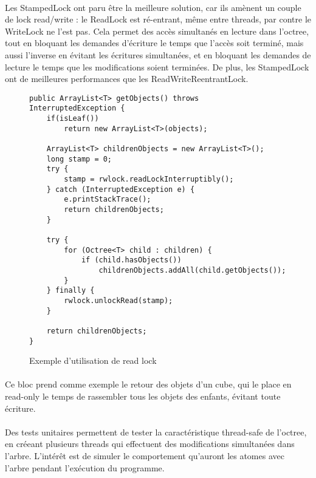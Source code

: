 \paragraph{}
Les StampedLock ont paru être la meilleure solution, car ils amènent un couple
de lock read/write : le ReadLock est ré-entrant, même entre threads, par contre
le WriteLock ne l'est pas. Cela permet des accès simultanés en lecture dans
l'octree, tout en bloquant les demandes d'écriture le temps que l'accès soit
terminé, mais aussi l'inverse en évitant les écritures simultanées, et en
bloquant les demandes de lecture le temps que les modifications soient
terminées. De plus, les StampedLock ont de meilleures performances que les
ReadWriteReentrantLock.


\begin{figure}[H]
\begin{lstlisting}
public ArrayList<T> getObjects() throws InterruptedException {
    if(isLeaf())
        return new ArrayList<T>(objects);

    ArrayList<T> childrenObjects = new ArrayList<T>();
    long stamp = 0;
    try {
        stamp = rwlock.readLockInterruptibly();
    } catch (InterruptedException e) {
        e.printStackTrace();
        return childrenObjects;
    }

    try {
        for (Octree<T> child : children) {
            if (child.hasObjects())
                childrenObjects.addAll(child.getObjects());
        }
    } finally {
        rwlock.unlockRead(stamp);
    }

    return childrenObjects;
}
\end{lstlisting}
\caption{Exemple d'utilisation de read lock}
\label{octree_code_getobjects}
\end{figure}

\paragraph{}
Ce bloc prend comme exemple le retour des objets d'un cube, qui le place en
read-only le temps de rassembler tous les objets des enfants, évitant toute
écriture.

\paragraph{}
Des tests unitaires permettent de tester la caractéristique thread-safe de
l'octree, en créeant plusieurs threads qui effectuent des modifications
simultanées dans l'arbre. L'intérêt est de simuler le comportement qu'auront
les atomes avec l'arbre pendant l'exécution du programme.


